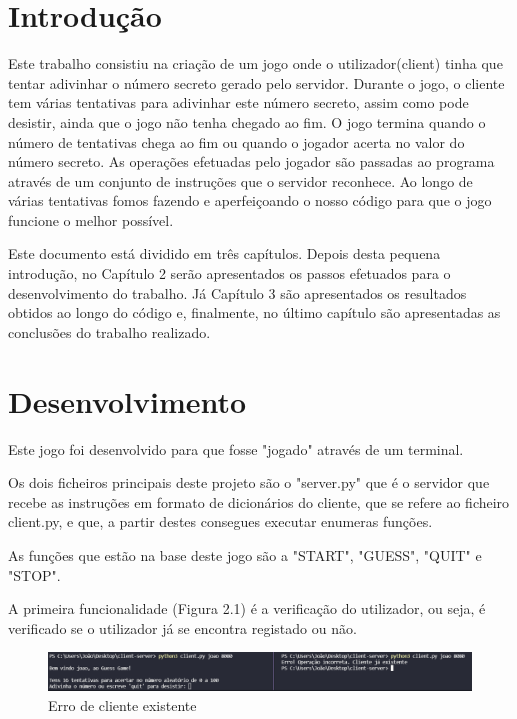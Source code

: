 \documentclass{report}
\begin{document}
\tableofcontents


\clearpage
{}

\chapter{Introdução}
\label{chap.introducao}

Este trabalho consistiu na criação de um jogo onde o utilizador(client) tinha que tentar adivinhar o número secreto gerado pelo servidor. Durante o jogo, o cliente tem várias tentativas para adivinhar este número secreto, assim como pode desistir, ainda que o jogo não tenha chegado ao fim. O jogo termina quando o número de tentativas chega ao fim ou quando o jogador acerta no valor do número secreto. As operações efetuadas pelo jogador são passadas ao programa através de um conjunto de instruções que o servidor reconhece. 
Ao longo de várias tentativas fomos fazendo e aperfeiçoando o nosso código para que o jogo funcione o melhor possível.

Este documento está dividido em três capítulos. Depois desta pequena  introdução, no
Capítulo 2 serão apresentados os passos efetuados para o desenvolvimento do trabalho. Já Capítulo 3 são apresentados os resultados obtidos ao longo do código e, finalmente,
no último capítulo são apresentadas as conclusões do trabalho realizado.


\chapter{Desenvolvimento}
\label{chap.metodologia}
Este jogo foi desenvolvido para que fosse "jogado" através de um terminal.

Os dois ficheiros principais deste projeto são o "server.py" que é o servidor que recebe as instruções em formato de dicionários do cliente, que se refere ao ficheiro client.py, e que, a partir destes consegues executar enumeras funções.

As funções que estão na base deste jogo são a "START", "GUESS", "QUIT" e "STOP".

A primeira funcionalidade (Figura 2.1) é a verificação do utilizador, ou seja, é verificado se o utilizador já se encontra registado ou não.
\vspace{10mm}
    \begin{figure}[h]
        \begin{center}
            \includegraphics[scale=0.5]{outro.png}
            \caption{Erro de cliente existente}
        \end{center}
    \end{figure}
\end{document}
